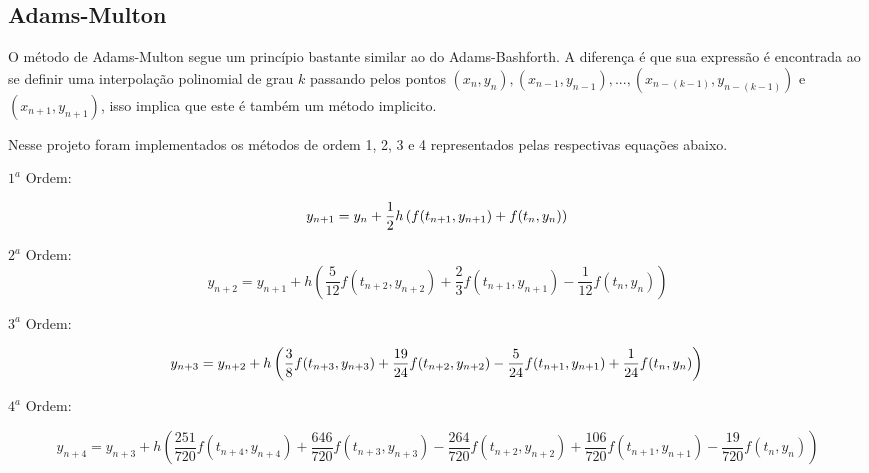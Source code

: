 \documentclass[a4paper]{article}
\begin{document}
\subsection{Adams-Multon}

O método de Adams-Multon segue um princípio bastante similar ao do Adams-Bashforth. A diferença é que sua expressão é encontrada ao se definir uma interpolação polinomial de grau $k$ passando pelos pontos $(x_n,y_n),(x_{n-1},y_{n-1}),...,(x_{n-(k-1)},y_{n-(k-1)})$ e $(x_{n+1},y_{n+1})$, isso implica que este é também um método implicito.

Nesse projeto foram implementados os métodos de ordem 1, 2, 3 e 4 representados pelas respectivas equações abaixo.
\vspace{5mm} %

$1^a$ Ordem: 

\begin{dmath}
\label{eq:multon1}
y_{n+1} = y_n + \frac{1}{2} h \left( f(t_{n+1},y_{n+1}) + f(t_n,y_n) \right) \\
\end{dmath}

$2^a$ Ordem: 
\begin{dmath}
\label{eq:multon2}
y_{n+2} = y_{n+1} + h \left( \frac{5}{12} f(t_{n+2},y_{n+2}) + \frac{2}{3} f(t_{n+1},y_{n+1}) - \frac{1}{12} f(t_n,y_n) \right)
\end{dmath}

$3^a$ Ordem: 

\begin{dmath}
\label{eq:multon3}
y_{n+3} = y_{n+2} + h \left( \frac{3}{8} f(t_{n+3},y_{n+3}) + \frac{19}{24} f(t_{n+2},y_{n+2}) - \frac{5}{24} f(t_{n+1},y_{n+1}) + \frac{1}{24} f(t_n,y_n) \right) \\
\end{dmath}

$4^a$ Ordem: 

\begin{dmath}
\label{eq:multon4}
y_{n+4} = y_{n+3} + h \left( \frac{251}{720} f(t_{n+4},y_{n+4}) + \frac{646}{720} f(t_{n+3},y_{n+3}) - \frac{264}{720} f(t_{n+2},y_{n+2}) + \frac{106}{720} f(t_{n+1},y_{n+1}) - \frac{19}{720} f(t_n,y_n) \right)
\end{dmath}
\end{document}
